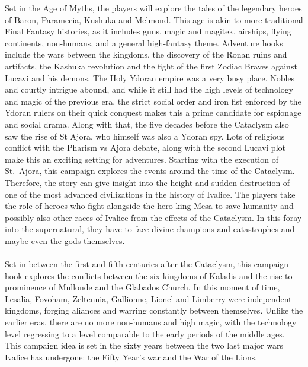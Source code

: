 \begin{multicols}{2}
%
Set in the Age of Myths, the players will explore the tales of the legendary heroes of Baron, Paramecia, Kushuka and Melmond. This age is akin to more
traditional Final Fantasy histories, as it includes guns, magic and magitek, airships, flying continents, non-humans, and a general high-fantasy theme.
Adventure hooks include the wars between the kingdoms, the discovery of the Ronan ruins and artifacts, the Kashuka revolution and the fight of the first Zodiac Braves against Lucavi and his demons.
%
\ofpar
%
The Holy Ydoran empire was a very busy place. 
Nobles and courtly intrigue abound, and while it still had the high levels of technology and magic of the previous era, the strict social order and iron fist enforced by the Ydoran rulers on their quick conquest makes this a prime candidate for espionage and social drama.
Along with that, the five decades before the Cataclysm also saw the rise of St Ajora, who himself was also a Ydoran spy.
Lots of religious conflict with the Pharism vs Ajora debate, along with the second Lucavi plot make this an exciting setting for adventures.
%
\ofpar
%
Starting with the execution of St.~Ajora, this campaign explores the events around the time of the Cataclysm.
Therefore, the story can give insight into the height and sudden destruction of one of the most advanced civilizations in the history of Ivalice.
The players take the role of heroes who fight alongside the hero-king Mesa to save humanity and possibly also other races of Ivalice from the effects of the Cataclysm.
In this foray into the supernatural, they have to face divine champions and catastrophes and maybe even the gods themselves.\\
%
\columnbreak\\
%
Set in between the first and fifth centuries after the Cataclysm, this campaign hook explores the conflicts between the six kingdoms of Kaladis and the rise to prominence of Mullonde and the Glabados Church.
In this moment of time, Lesalia, Fovoham, Zeltennia, Gallionne, Lionel and Limberry were independent kingdoms, forging aliances and warring constantly between themselves. 
Unlike the earlier eras, there are no more non-humans and high magic, with the technology level regressing to a level comparable to the early periods of the middle ages.
%
\ofpar
%
This campaign idea is set in the sixty years between the two last major wars Ivalice has undergone: the Fifty Year’s war and the War of the Lions.

\end{multicols}
